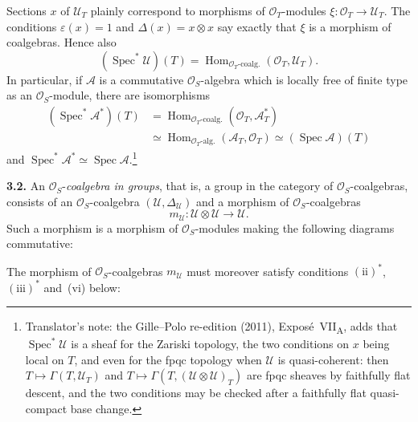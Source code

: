 Sections \(x\) of \(\mathcal U_T\) plainly correspond to morphisms
of \(\mathcal O_T\)-modules
\(\xi:\mathcal O_T\to\mathcal U_T\). The conditions
\(\varepsilon(x)=1\) and \(\Delta(x)=x\otimes x\) say exactly that
\(\xi\) is a morphism of coalgebras. Hence also
\[
  (\operatorname{Spec}^{*}\mathcal U)(T)
  =
  \operatorname{Hom}_{\mathcal O_T\text{-coalg.}}
    (\mathcal O_T,\mathcal U_T).
\]
In particular, if \(\mathcal A\) is a commutative
\(\mathcal O_S\)-algebra which is locally free of finite type as an
\(\mathcal O_S\)-module, there are isomorphisms
\[
  \begin{aligned}
  (\operatorname{Spec}^{*}\mathcal A^{*})(T)
  &=
  \operatorname{Hom}_{\mathcal O_T\text{-coalg.}}
    (\mathcal O_T,\mathcal A_T^{*})                                      \\
  &\simeq
  \operatorname{Hom}_{\mathcal O_T\text{-alg.}}
    (\mathcal A_T,\mathcal O_T)
  \simeq
  (\operatorname{Spec}\mathcal A)(T)
  \end{aligned}
\]
and \(\operatorname{Spec}^{*}\mathcal A^{*}\simeq\operatorname{Spec}\mathcal A\).\footnote{Translator's
note: the Gille--Polo re-edition (2011), Expos\'e~VII\textsubscript{A},
adds that \(\operatorname{Spec}^{*}\mathcal U\) is a sheaf for the
Zariski topology, the two conditions on \(x\) being local on \(T\), and
even for the fpqc topology when \(\mathcal U\) is quasi-coherent: then
\(T\mapsto\Gamma(T,\mathcal U_T)\) and
\(T\mapsto\Gamma(T,(\mathcal U\otimes\mathcal U)_T)\) are fpqc sheaves by
faithfully flat descent, and the two conditions may be checked after a
faithfully flat quasi-compact base change.}

\medskip
\noindent\textbf{3.2.}
\label{sga3:VIIA:3.2}
An \(\mathcal O_S\)-\emph{coalgebra in groups}, that is, a group in
the category of \(\mathcal O_S\)-coalgebras, consists of an
\(\mathcal O_S\)-coalgebra
\((\mathcal U,\Delta_{\mathcal U})\) and a morphism of
\(\mathcal O_S\)-coalgebras
\[
  m_{\mathcal U}:\mathcal U\otimes\mathcal U\longrightarrow\mathcal U.
\]
Such a morphism is a morphism of \(\mathcal O_S\)-modules making the
following diagrams commutative:
\begin{center}
  \label{sga3:VIIA:3.2-compatibility-iv-v}
  
\end{center}
The morphism of \(\mathcal O_S\)-coalgebras \(m_{\mathcal U}\) must
moreover satisfy conditions \((\mathrm{ii})^{*}\),
\((\mathrm{iii})^{*}\) and~(vi) below:


